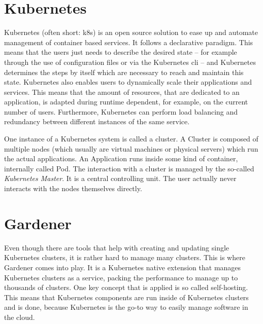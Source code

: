 \section{Kubernetes}
\label{sec:kubernetes}
Kubernetes (often short: k8s) is an open source solution to ease up and automate management of container based services.
It follows a declarative paradigm.
This means that the users just needs to describe the desired state -- for example through the use of configuration files or via the Kubernetes \ac{cli} -- and Kubernetes determines the steps by itself which are necessary to reach and maintain this state.
Kubernetes also enables users to dynamically scale their applications and services.
This means that the amount of resources, that are dedicated to an application, is adapted during runtime dependent, for example, on the current number of users.
Furthermore, Kubernetes can perform load balancing and redundancy between different instances of the same service.
\cite{Bloß2019, wasistk8s}

One instance of a Kubernetes system is called a cluster.
A Cluster is composed of multiple nodes (which usually are virtual machines or physical servers) which run the actual applications.
An Application runs inside some kind of container, internally called Pod.
The interaction with a cluster is managed by the so-called \emph{Kubernetes Master}.
It is a central controlling unit.
The user actually never interacts with the nodes themselves directly.
\cite{k8skonzepte}

\section{Gardener}
Even though there are tools that help with creating and updating single Kubernetes clusters, it is rather hard to manage many clusters.
This is where Gardener comes into play.
It is a Kubernetes native extension that manages Kubernetes clusters as a service, packing the performance to manage up to thousands of clusters.
One key concept that is applied is so called self-hosting.
This means that Kubernetes components are run inside of Kubernetes clusters and is done, because Kubernetes is the go-to way to easily manage software in the cloud. \cite{gardener.architecture, gardener.blog1, gardener.blog2, gardener.cloud}

